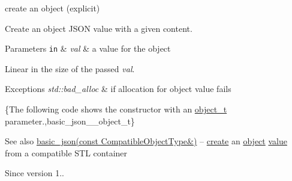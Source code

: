 create an object (explicit) 

Create an object J\+S\+ON value with a given content.


\begin{DoxyParams}[1]{Parameters}
\mbox{\tt in}  & {\em val} & a value for the object\\
\hline
\end{DoxyParams}
Linear in the size of the passed {\itshape val}.


\begin{DoxyExceptions}{Exceptions}
{\em std\+::bad\+\_\+alloc} & if allocation for object value fails\\
\hline
\end{DoxyExceptions}
\{The following code shows the constructor with an \hyperlink{classnlohmann_1_1basic__json_a0ac9894c9de8dc551cf2e5f1c605537f}{object\+\_\+t} parameter.,basic\+\_\+json\+\_\+\+\_\+object\+\_\+t\}

\begin{DoxySeeAlso}{See also}
\hyperlink{classnlohmann_1_1basic__json_ab7be2bc58ae0c2c2c30d40f15d6399f8}{basic\+\_\+json(const Compatible\+Object\+Type\&)} -- \hyperlink{classnlohmann_1_1basic__json_afdb7a485369fbfd8c4c7c134ebb1feb5}{create} an \hyperlink{classnlohmann_1_1basic__json_ad25b2f8c21e241e2d63455537a9294ff}{object} \hyperlink{classnlohmann_1_1basic__json_a407e73a037e6e3067ef7aa2c25a79f39}{value} from a compatible S\+TL container
\end{DoxySeeAlso}
\begin{DoxySince}{Since}
version 1.. 
\end{DoxySince}
\hypertarget{classnlohmann_1_1basic__json_ab7be2bc58ae0c2c2c30d40f15d6399f8}{}\label{classnlohmann_1_1basic__json_ab7be2bc58ae0c2c2c30d40f15d6399f8} 
